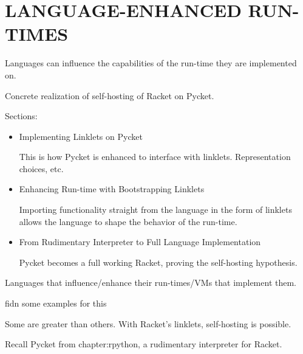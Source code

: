 \chapter[\texorpdfstring{LANGUAGE-ENHANCED RUN-TIMES}
                          {4. Pycket as Full Racket}]{LANGUAGE-ENHANCED RUN-TIMES}
	\label{chapter:pycket}

	\begin{chaptersynopsis}

        Languages can influence the capabilities of the run-time they are implemented on.

		Concrete realization of self-hosting of Racket on Pycket.

        \vspace{2em}

        Sections:
		\begin{itemize}
			\item Implementing Linklets on Pycket

			This is how Pycket is enhanced to interface with linklets. Representation choices, etc.

			\item Enhancing Run-time with Bootstrapping Linklets

			Importing functionality straight from the language in the form of linklets allows the language to shape the behavior of the run-time.

			\item From Rudimentary Interpreter to Full Language Implementation

			Pycket becomes a full working Racket, proving the self-hosting hypothesis.

		\end{itemize}
    \end{chaptersynopsis}

	\begin{paragraph-here}%
		Languages that influence/enhance their run-times/VMs that implement them.

		\begin{todo}
			fidn some examples for this
		\end{todo}
	\end{paragraph-here}

	\begin{paragraph-here}%
		Some are greater than others. With Racket's linklets, self-hosting is possible.
	\end{paragraph-here}

	\begin{paragraph-here}%
		Recall Pycket from chapter:rpython, a rudimentary interpreter for Racket.	\end{paragraph-here}

